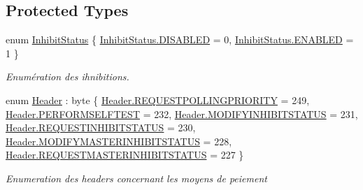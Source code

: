 \subsection*{Protected Types}
\begin{DoxyCompactItemize}
\item 
enum \mbox{\hyperlink{class_device_library_1_1_ccash_reader_a789dcffa38ad9d646e32c448632ceaff}{Inhibit\+Status}} \{ \mbox{\hyperlink{class_device_library_1_1_ccash_reader_a789dcffa38ad9d646e32c448632ceaffa055c1a591abb0e8cd86dc969727bcc0b}{Inhibit\+Status.\+D\+I\+S\+A\+B\+L\+ED}} = 0, 
\mbox{\hyperlink{class_device_library_1_1_ccash_reader_a789dcffa38ad9d646e32c448632ceaffac8cf6eea8f096ed51160b484d97c5bbd}{Inhibit\+Status.\+E\+N\+A\+B\+L\+ED}} = 1
 \}
\begin{DoxyCompactList}\small\item\em Enumération des ihnibitions. \end{DoxyCompactList}\item 
enum \mbox{\hyperlink{class_device_library_1_1_ccash_reader_af4bdeeddb7c89dd2b54f86978f5e9866}{Header}} \+: byte \{ \newline
\mbox{\hyperlink{class_device_library_1_1_ccash_reader_af4bdeeddb7c89dd2b54f86978f5e9866ae528792c78a8f0df73cb539242c9db57}{Header.\+R\+E\+Q\+U\+E\+S\+T\+P\+O\+L\+L\+I\+N\+G\+P\+R\+I\+O\+R\+I\+TY}} = 249, 
\mbox{\hyperlink{class_device_library_1_1_ccash_reader_af4bdeeddb7c89dd2b54f86978f5e9866ae268218a830fbe959f8a433163e8187a}{Header.\+P\+E\+R\+F\+O\+R\+M\+S\+E\+L\+F\+T\+E\+ST}} = 232, 
\mbox{\hyperlink{class_device_library_1_1_ccash_reader_af4bdeeddb7c89dd2b54f86978f5e9866a57fa2152134db32c8ccf2c03fd965489}{Header.\+M\+O\+D\+I\+F\+Y\+I\+N\+H\+I\+B\+I\+T\+S\+T\+A\+T\+US}} = 231, 
\mbox{\hyperlink{class_device_library_1_1_ccash_reader_af4bdeeddb7c89dd2b54f86978f5e9866a86d5eb66e4f787072c88909f8de0ee99}{Header.\+R\+E\+Q\+U\+E\+S\+T\+I\+N\+H\+I\+B\+I\+T\+S\+T\+A\+T\+US}} = 230, 
\newline
\mbox{\hyperlink{class_device_library_1_1_ccash_reader_af4bdeeddb7c89dd2b54f86978f5e9866aa932deef49f85794660b6e9b0fd2f426}{Header.\+M\+O\+D\+I\+F\+Y\+M\+A\+S\+T\+E\+R\+I\+N\+H\+I\+B\+I\+T\+S\+T\+A\+T\+US}} = 228, 
\mbox{\hyperlink{class_device_library_1_1_ccash_reader_af4bdeeddb7c89dd2b54f86978f5e9866a9feb77035916af7a4a90c7e62047cee0}{Header.\+R\+E\+Q\+U\+E\+S\+T\+M\+A\+S\+T\+E\+R\+I\+N\+H\+I\+B\+I\+T\+S\+T\+A\+T\+US}} = 227
 \}
\begin{DoxyCompactList}\small\item\em Enumeration des headers concernant les moyens de peiement \end{DoxyCompactList}\end{DoxyCompactItemize}
